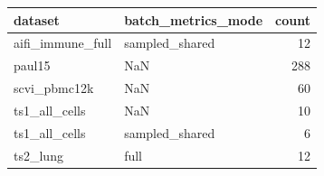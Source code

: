 \begin{tabular}{llr}
\toprule
dataset & batch\_metrics\_mode & count \\
\midrule
aifi\_immune\_full & sampled\_shared & 12 \\
paul15 & NaN & 288 \\
scvi\_pbmc12k & NaN & 60 \\
ts1\_all\_cells & NaN & 10 \\
ts1\_all\_cells & sampled\_shared & 6 \\
ts2\_lung & full & 12 \\
\bottomrule
\end{tabular}
